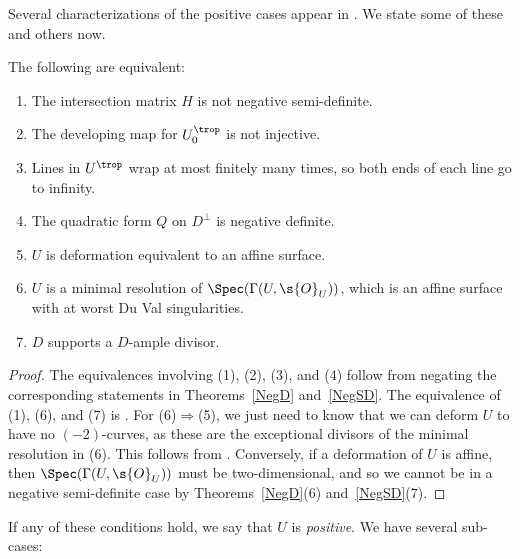 Several characterizations of the positive cases appear in \cite[Lemma~6.9]{GHK1}. We state some of these and others now.
\begin{thm}\label{Pos} The following are equivalent:
\begin{enumerate}\itemsep=0pt
\item[$1.$] The {intersection matrix} $H$ is not negative semi-definite.
\item[$2.$] The {developing map} for $U^{\trop}_0$ is not injective.
\item[$3.$] {Lines} in $U^{\trop}$ wrap at most finitely many times, so both ends of each line go to infinity.
\item[$4.$] The {quadratic form} $Q$ on $D^{\perp}$ is negative definite.
\item[$5.$] $U$ is deformation equivalent to an affine surface.
\item[$6.$] $U$ is a minimal resolution of $\Spec (\Gamma(U,\s{O}_U))$, which is an affine surface with at worst Du Val singularities.
\item[$7.$] $D$ supports a $D$-ample divisor.
\end{enumerate}
\end{thm}
\begin{proof}The equivalences involving (1), (2), (3), and (4) follow from negating the corresponding statements in Theorems~\ref{NegD} and~\ref{NegSD}. The equivalence of (1), (6), and (7) is \cite[Lemma~6.9(1.1--1.3)]{GHK1}. For (6)$\Rightarrow$(5), we just need to know that we can deform $U$ to have no $(-2)$-curves, as these are the exceptional divisors of the minimal resolution in (6). This follows from \cite[Proposition~4.1]{GHK_MLP}. Conversely, if a deformation of $U$ is affine, then $\Spec (\Gamma(U,\s{O}_U))$ must be two-dimensional, and so we cannot be in a negative semi-definite case by Theorems~\ref{NegD}(6) and~\ref{NegSD}(7).
\end{proof}

If any of these conditions hold, we say that $U$ is {\it positive}. We have several sub-cases:

